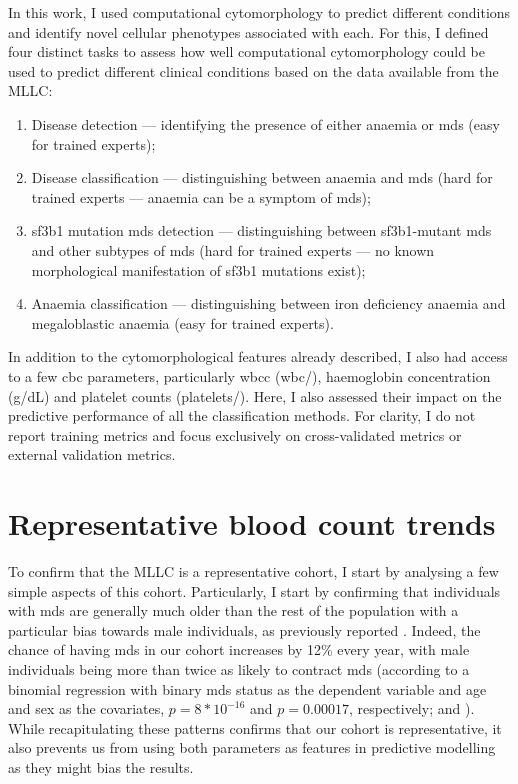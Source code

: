 In this work, I used computational cytomorphology to predict different conditions and identify novel cellular phenotypes associated with each. For this, I defined four distinct tasks to assess how well computational cytomorphology could be used to predict different clinical conditions based on the data available from the MLLC:

\begin{enumerate}
    \item Disease detection --- identifying the presence of either anaemia or \ac{mds} (easy for trained experts);
    \item Disease classification --- distinguishing between anaemia and \ac{mds} (hard for trained experts --- anaemia can be a symptom of \ac{mds});
    \item \ac{sf3b1} mutation \ac{mds} detection --- distinguishing between \ac{sf3b1}-mutant \ac{mds} and other subtypes of \ac{mds} (hard for trained experts --- no known morphological manifestation of \ac{sf3b1} mutations exist);
    \item Anaemia classification --- distinguishing between iron deficiency anaemia and megaloblastic anaemia (easy for trained experts).
\end{enumerate}

In addition to the cytomorphological features already described, I also had access to a few \ac{cbc} parameters, particularly \ac{wbcc} (\ac{wbc}/\Mum), haemoglobin concentration (g/dL) and platelet counts (platelets/\Mum). Here, I also assessed their impact on the predictive performance of all the classification methods. For clarity, I do not report training metrics and focus exclusively on cross-validated metrics or external validation metrics.

\section{Representative blood count trends}

To confirm that the MLLC is a representative cohort, I start by analysing a few simple aspects of this cohort. Particularly, I start by confirming that individuals with \ac{mds} are generally much older than the rest of the population with a particular bias towards male individuals, as previously reported \cite{Rollison2008-yg}. Indeed, the chance of having \ac{mds} in our cohort increases by 12\% every year, with male individuals being more than twice as likely to contract \ac{mds} (according to a binomial regression with binary \ac{mds} status as the dependent variable and age and sex as the covariates, $p=8*10^{-16}$ and $p=0.00017$, respectively;  and ). While recapitulating these patterns confirms that our cohort is representative, it also prevents us from using both parameters as features in predictive modelling as they might bias the results.

